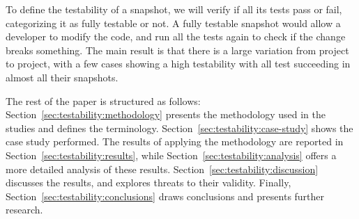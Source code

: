 To define the testability of a snapshot, we will verify if all its tests pass or fail, categorizing it as fully testable or not.
A fully testable snapshot would allow a developer to modify the code, and run all the tests again to check if the change breaks something.
The main result is that there is a large variation from project to project, with a few cases showing a high testability with all test succeeding in almost all their snapshots. 



The rest of the paper is structured as follows:
Section~\ref{sec:testability:methodology} presents the methodology used in the studies and defines the terminology. 
Section~\ref{sec:testability:case-study} shows the case study performed.
The results of applying the methodology are reported in Section~\ref{sec:testability:results}, while Section~\ref{sec:testability:analysis} offers a more detailed analysis of these results.
Section~\ref{sec:testability:discussion} discusses the results, and explores threats to their validity.
Finally, Section~\ref{sec:testability:conclusions} draws conclusions and presents further research.

